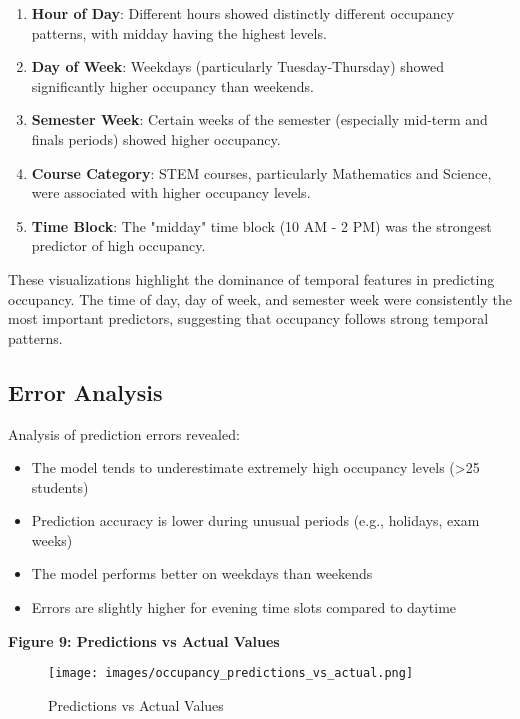 \documentclass[12pt,letterpaper]{article}
\begin{document}
\begin{enumerate}
    \item \textbf{Hour of Day}: Different hours showed distinctly different occupancy patterns, with midday having the highest levels.
    \item \textbf{Day of Week}: Weekdays (particularly Tuesday-Thursday) showed significantly higher occupancy than weekends.
    \item \textbf{Semester Week}: Certain weeks of the semester (especially mid-term and finals periods) showed higher occupancy.
    \item \textbf{Course Category}: STEM courses, particularly Mathematics and Science, were associated with higher occupancy levels.
    \item \textbf{Time Block}: The "midday" time block (10 AM - 2 PM) was the strongest predictor of high occupancy.
\end{enumerate}

These visualizations highlight the dominance of temporal features in predicting occupancy. The time of day, day of week, and semester week were consistently the most important predictors, suggesting that occupancy follows strong temporal patterns.

\subsection{Error Analysis}

Analysis of prediction errors revealed:

\begin{itemize}
    \item The model tends to underestimate extremely high occupancy levels (>25 students)
    \item Prediction accuracy is lower during unusual periods (e.g., holidays, exam weeks)
    \item The model performs better on weekdays than weekends
    \item Errors are slightly higher for evening time slots compared to daytime
\end{itemize}

\textbf{Figure 9: Predictions vs Actual Values}

\begin{figure}[H]
    \centering
    \texttt{[image: images/occupancy\_predictions\_vs\_actual.png]}
    \caption{Predictions vs Actual Values}
\end{figure}
\end{document}
